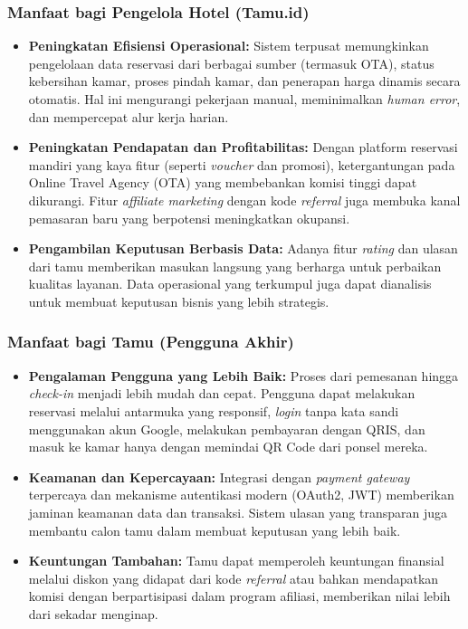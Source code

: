 \subsubsection{Manfaat bagi Pengelola Hotel (Tamu.id)}
\begin{itemize}
    \item \textbf{Peningkatan Efisiensi Operasional:} Sistem terpusat memungkinkan pengelolaan data reservasi dari berbagai sumber (termasuk OTA), status kebersihan kamar, proses pindah kamar, dan penerapan harga dinamis secara otomatis. Hal ini mengurangi pekerjaan manual, meminimalkan \textit{human error}, dan mempercepat alur kerja harian.
    \item \textbf{Peningkatan Pendapatan dan Profitabilitas:} Dengan platform reservasi mandiri yang kaya fitur (seperti \textit{voucher} dan promosi), ketergantungan pada Online Travel Agency (OTA) yang membebankan komisi tinggi dapat dikurangi. Fitur \textit{affiliate marketing} dengan kode \textit{referral} juga membuka kanal pemasaran baru yang berpotensi meningkatkan okupansi.
    \item \textbf{Pengambilan Keputusan Berbasis Data:} Adanya fitur \textit{rating} dan ulasan dari tamu memberikan masukan langsung yang berharga untuk perbaikan kualitas layanan. Data operasional yang terkumpul juga dapat dianalisis untuk membuat keputusan bisnis yang lebih strategis.
\end{itemize}

\subsubsection{Manfaat bagi Tamu (Pengguna Akhir)}
\begin{itemize}
    \item \textbf{Pengalaman Pengguna yang Lebih Baik:} Proses dari pemesanan hingga \textit{check-in} menjadi lebih mudah dan cepat. Pengguna dapat melakukan reservasi melalui antarmuka yang responsif, \textit{login} tanpa kata sandi menggunakan akun Google, melakukan pembayaran dengan QRIS, dan masuk ke kamar hanya dengan memindai QR Code dari ponsel mereka.
    \item \textbf{Keamanan dan Kepercayaan:} Integrasi dengan \textit{payment gateway} terpercaya dan mekanisme autentikasi modern (OAuth2, JWT) memberikan jaminan keamanan data dan transaksi. Sistem ulasan yang transparan juga membantu calon tamu dalam membuat keputusan yang lebih baik.
    \item \textbf{Keuntungan Tambahan:} Tamu dapat memperoleh keuntungan finansial melalui diskon yang didapat dari kode \textit{referral} atau bahkan mendapatkan komisi dengan berpartisipasi dalam program afiliasi, memberikan nilai lebih dari sekadar menginap.
\end{itemize}

